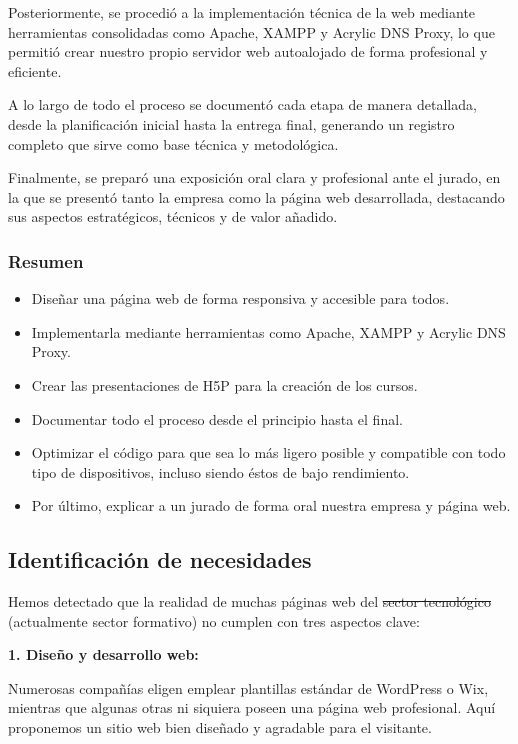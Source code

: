 \documentclass[11.5pt]{article}
\begin{document}
	Posteriormente, se procedió a la implementación técnica de la web mediante herramientas consolidadas como Apache, XAMPP y Acrylic DNS Proxy, lo que permitió crear nuestro propio servidor web autoalojado de forma profesional y eficiente. 

	A lo largo de todo el proceso se documentó cada etapa de manera detallada, desde la planificación inicial hasta la entrega final, generando un registro completo que sirve como base técnica y metodológica.
	
	Finalmente, se preparó una exposición oral clara y profesional ante el jurado, en la que se presentó tanto la empresa como la página web desarrollada, destacando sus aspectos estratégicos, técnicos y de valor añadido.
	\subsubsection{Resumen}

	\begin{itemize}
		\item Diseñar una página web de forma responsiva y accesible para todos.
		\item 	Implementarla mediante herramientas como Apache, XAMPP y Acrylic DNS Proxy.
		\item 	Crear las presentaciones de H5P para la creación de los cursos.
		\item 	Documentar todo el proceso desde el principio hasta el final.
		\item 	Optimizar el código para que sea lo más ligero posible y compatible con todo tipo de dispositivos, incluso siendo éstos de bajo rendimiento.
		\item 	Por último, explicar a un jurado de forma oral nuestra empresa y página web.
	\end{itemize}
	
	\subsection{Identificación de necesidades}
	
	Hemos detectado que la realidad de muchas páginas web del \sout{sector tecnológico} (actualmente sector formativo) no cumplen con tres aspectos clave:
	
	\textbf{1. Diseño y desarrollo web:}
	
	Numerosas compañías eligen emplear plantillas estándar de WordPress o Wix, mientras que algunas otras ni siquiera poseen una página web profesional. Aquí proponemos un sitio web bien diseñado y agradable para el visitante.
	
\end{document}
